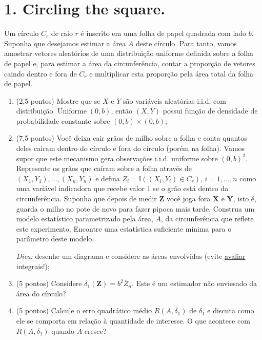 \documentclass[a4paper,10pt, notitlepage]{report}
\begin{document}
\newpage

\section*{1. Circling the square.}

Um círculo $C_r$  de raio $r$ é inscrito em uma folha de papel quadrada com lado $b$.
Suponha que desejamos estimar a área $A$ deste círculo.
Para tanto, vamos amostrar vetores aleatórios de uma distribuição uniforme definida sobre a folha de papel e, para estimar a área da circunferência, contar a proporção de vetores caindo dentro e fora de $C_r$ e multiplicar esta proporção pela área total da folha de papel.

\begin{enumerate}[label=\alph*)]
 \item (2,5 pontos) Mostre que se $X$ e $Y$ são variáveis aleatórias i.i.d. com distribuição $\operatorname{Uniforme}(0,b)$, então $(X,Y)$ possui função de densidade de probabilidade constante sobre $(0, b)\times (0,b)$;
 
 \item (7,5 pontos) Você deixa cair grãos de milho sobre a folha e conta quantos deles cairam dentro do círculo e fora do círculo (porém na folha).
    Vamos supor que este mecanismo gera observações i.i.d. uniforme sobre $(0,b)^2$.
    Represente os grãos que caíram sobre a folha através de $(X_1,Y_1),...,(X_n,Y_n)$ e  defina $Z_i = \mathbb{I}((X_i,Y_i)\in C_r)$, $i=1,...,n$ como uma variável indicadora que recebe valor $1$ se o grão está dentro da circunferência.
    Suponha que depois de medir $\boldsymbol{Z}$ você joga fora $\boldsymbol{X}$ e $\boldsymbol{Y}$, isto é, guarda o milho no pote de novo para fazer pipoca mais tarde.
    Construa um modelo estatístico parametrizado pela área, $A$, da circunferência que reflete este experimento.
    Encontre uma estatística suficiente mínima para o parâmetro deste modelo.
    
    \textit{Dica:} desenhe um diagrama e considere as áreas envolvidas (evite \underline{avaliar} integrais!);
    
 \item (5 pontos) Considere $\delta_1(\boldsymbol{Z}) = b^2\bar{Z}_n$.
 Este é um estimador não enviesado da área do círculo?
 \item (5 pontos) Calcule o erro quadrático médio $R(A, \delta_1)$ de $\delta_1$ e discuta como ele se comporta em relação à quantidade de interesse.
 O que acontece com $R(A, \delta_1)$ quando $A$ cresce?
\end{enumerate}
\end{document}
